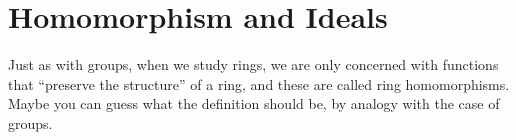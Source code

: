 \chapter{Homomorphism and Ideals}\label{chp:4_2}

Just as with groups, when we study rings, we are only concerned with functions that “preserve the
structure” of a ring, and these are called ring homomorphisms. Maybe you can guess what the definition
should be, by analogy with the case of groups.

